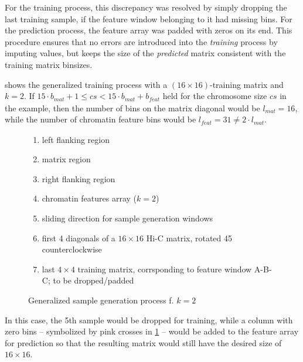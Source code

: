 For the training process, this discrepancy was resolved by simply dropping the last training sample, 
if the feature window belonging to it had missing bins.
For the prediction process, the feature array was padded with zeros on its end.
This procedure ensures that no errors are introduced into the \emph{training} process by imputing values,
but keeps the size of the \emph{predicted} matrix consistent with the training matrix binsizes.

 shows the generalized training process with a $(16\times16)$-training matrix and $k=2$. 
If  $15\cdot b_\mathit{mat} + 1 \leq cs < 15\cdot b_\mathit{mat} + b_\mathit{feat}$ held for the chromosome size $cs$ in the example,
then the number of bins on the matrix diagonal would be $l_\mathit{mat}=16$, while the number of chromatin feature bins would be $l_\mathit{feat}=31 \not = 2 \cdot l_\mathit{mat}$.
\begin{figure}
 \begin{minipage}{0.65\textwidth}
    \caption{Generalized sample generation process f. $k=2$}
    \label{fig:methods:sample_gen_generalized}
 \end{minipage}\hfill
 \begin{minipage}{0.3\textwidth}
 \scriptsize
  \begin{enumerate}[label=\Alph*:,leftmargin=*]
   \raggedright
    \item left flanking region
    \item matrix region
    \item right flanking region
    \item chromatin features array ($k=2$)
    \item sliding direction for sample generation windows
    \item first 4 diagonals of a $16\times16$ Hi-C matrix, rotated \SI{45}{\deg} counterclockwise
    \item last $4\times4$ training matrix, corrsponding to feature window A-B-C; to be dropped/padded
\end{enumerate}
 \end{minipage}
\end{figure}
In this case, the 5th sample would be dropped for training,
while a column with zero bins -- symbolized by pink crosses in \cref{fig:methods:sample_gen_generalized} -- would be added to the feature array for prediction
so that the resulting matrix would still have the desired size of $16 \times 16$.

